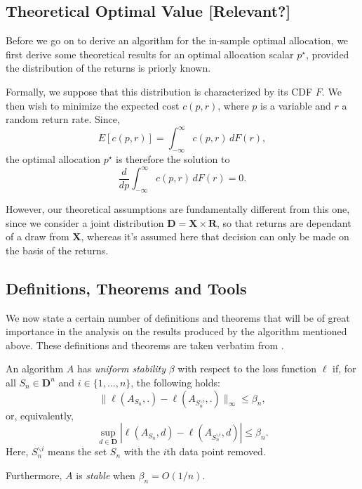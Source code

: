 \subsection{Theoretical Optimal Value [Relevant?]}

Before we go on to derive an algorithm for the in-sample optimal allocation, we first
derive some theoretical results for an optimal allocation scalar $p^\star$, provided the
distribution of the returns is priorly known. 

Formally, we suppose that this distribution is characterized by its CDF $F$. We then wish
to minimize the expected cost $c(p,r)$, where $p$ is a variable and $r$ a random return
rate. Since,
\begin{equation}
  E[c(p,r)] = \int_{-\infty}^{\infty} c(p,r)\,dF(r),
\end{equation}
the optimal allocation $p^\star$ is therefore the solution to
\begin{equation}
  \frac{d}{dp} \int_{-\infty}^{\infty} c(p,r)\,dF(r) = 0.
\end{equation}

However, our theoretical assumptions are fundamentally different from this one, since we
consider a joint distribution $\bm D= \bm X \times \bm R$, so that returns are dependant
of a draw from $\bm X$, whereas it's assumed here that decision can only be made on the
basis of the returns. 

\subsection{Definitions, Theorems and Tools}
We now state a certain number of definitions and theorems that will be of great importance
in the analysis on the results produced by the algorithm mentioned above. These
definitions and theorems are taken verbatim from \cite{bousquet2002}.

\begin{deff}
  An algorithm $A$ has \textit{uniform stability} $\beta$ with respect to the loss
  function $\ell$ if, for all $S_n\in\bm D^n$ and $i\in\{1,\ldots,n\}$, the following
  holds:
  \begin{equation}
    \|\ell(A_{S_n},.) - \ell(A_{S^{\backslash i}_n},.)\|_{\infty} \leq \beta_n,
  \end{equation}
  or, equivalently,
  \begin{equation}
    \sup_{d\in\bm D}|\ell(A_{S_n},d) - \ell(A_{S^{\backslash i}_n},d)| \leq \beta_n.
  \end{equation}
  Here, $S^{\backslash i}_n$ means the set $S_n$ with the $i$th data point removed.

  Furthermore, $A$ is \textit{stable} when $\beta_n = O(1/n)$.
\end{deff}

